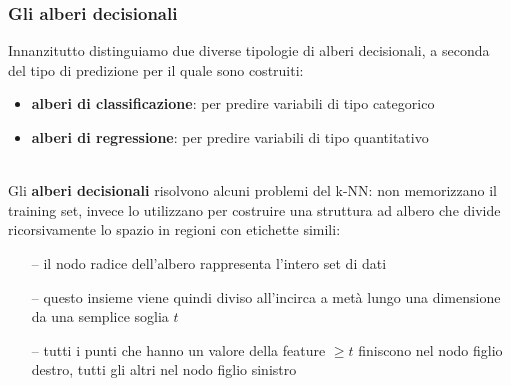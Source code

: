 \begin{frame}
	
	\frametitle{Gli alberi decisionali}
	
	Innanzitutto distinguiamo due diverse tipologie di alberi decisionali, a seconda del tipo di predizione per il quale sono costruiti:
	\begin{itemize}
		\item \textbf{alberi di classificazione}: per predire variabili di tipo categorico
		\item \textbf{alberi di regressione}: per predire variabili di tipo quantitativo
	\end{itemize}
	\  \\
	Gli \textbf{alberi decisionali} risolvono alcuni problemi del k-NN: non memorizzano il training set, invece lo utilizzano per costruire una struttura ad albero che divide ricorsivamente lo spazio in regioni con etichette simili:
	\begin{itemize}
		\item[--] il nodo radice dell'albero rappresenta l'intero set di dati
		\item[--] questo insieme viene quindi diviso all'incirca a metà lungo una dimensione da una semplice soglia $t$
		\item[--] tutti i punti che hanno un valore della feature $\geq t$ finiscono nel nodo figlio destro, tutti gli altri nel nodo figlio sinistro
	\end{itemize}

\end{frame}


